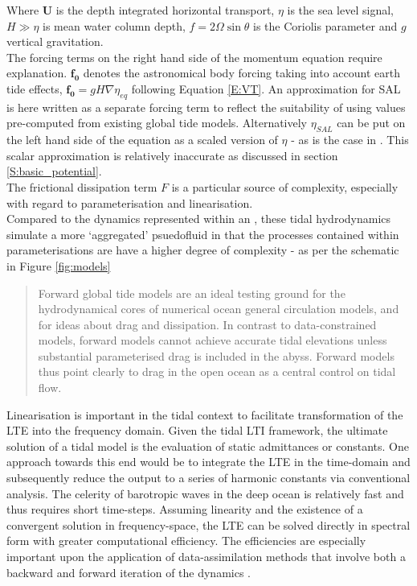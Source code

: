Where $\mathbf{U}$ is the depth integrated horizontal transport, $\eta$ is the sea level signal, $H \gg \eta$ is mean water column depth, $f=2\Omega\sin\theta$ is the Coriolis parameter and $g$ vertical gravitation.\\
The forcing terms on the right hand side of the momentum equation \label{E:LTE_momtm} require explanation.  
$\mathbf{f_0}$ denotes the astronomical body forcing taking into account earth tide effects, $\mathbf{f_0} = gH\nabla\eta_{eq}$ following Equation \ref{E:VT}.  
An approximation for SAL is here written as a separate forcing term to reflect the suitability of using values pre-computed from existing global tide models.   
Alternatively $\eta_{SAL}$ can be put on the left hand side of the equation as a scaled version of $\eta$ - as is the case in \MOM{}.   
This scalar approximation is relatively inaccurate as discussed in section \ref{S:basic_potential}.\\
The frictional dissipation term $F$ is a particular source of complexity, especially with regard to parameterisation and linearisation.\\

Compared to the dynamics represented within an \OGCM{}, these tidal hydrodynamics simulate a more `aggregated' psuedofluid in that the processes contained within parameterisations are have a higher degree of complexity - as per the schematic in Figure \ref{fig:models} \\
\begin{quotation}
Forward global tide models are an ideal testing ground for the hydrodynamical cores of numerical ocean general circulation models, and for ideas about drag and dissipation. In contrast to data-constrained models, forward models cannot achieve accurate tidal elevations unless substantial parameterised drag is included in the abyss. Forward models thus point clearly to drag in the open ocean as a central control on tidal flow.\citep{Arbic:2004wz}
\end{quotation} 


Linearisation is important in the tidal context to facilitate transformation of the LTE into the frequency domain.   Given the tidal LTI framework, the ultimate solution of a tidal model is the evaluation of static admittances or constants.   One approach towards this end would be to integrate the LTE in the time-domain and subsequently reduce the output to a series of harmonic constants via conventional analysis.   The celerity of barotropic waves in the deep ocean is relatively fast and thus requires short time-steps.   Assuming linearity and the existence of a convergent solution in frequency-space, the LTE can be solved directly in spectral form with greater computational efficiency.   The efficiencies are especially important upon the application of data-assimilation methods that involve both a backward and forward iteration of the dynamics \cite[pp184]{Egbert:2002ug}.


